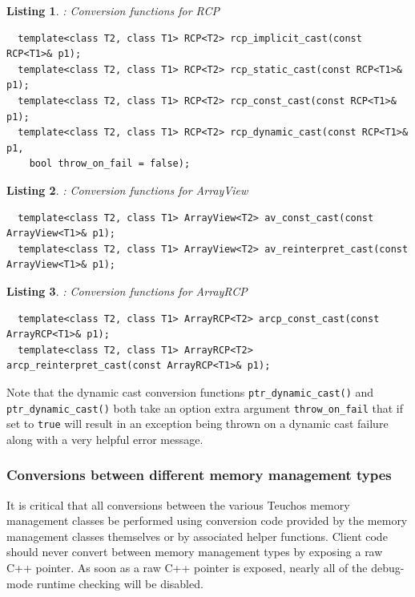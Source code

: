 \documentclass[pdf,ps2pdf,11pt]{SANDreport}
\newtheorem{listing}{Listing}
\begin{document}
\begin{listing}: Conversion functions for RCP\\
\label{listing:RCP-conversions}
{\small\begin{verbatim}
  template<class T2, class T1> RCP<T2> rcp_implicit_cast(const RCP<T1>& p1);
  template<class T2, class T1> RCP<T2> rcp_static_cast(const RCP<T1>& p1);
  template<class T2, class T1> RCP<T2> rcp_const_cast(const RCP<T1>& p1);
  template<class T2, class T1> RCP<T2> rcp_dynamic_cast(const RCP<T1>& p1,
    bool throw_on_fail = false);
\end{verbatim}}
\end{listing}

\begin{listing}: Conversion functions for ArrayView\\
\label{listing:ArrayView-conversions}
{\small\begin{verbatim}
  template<class T2, class T1> ArrayView<T2> av_const_cast(const ArrayView<T1>& p1);
  template<class T2, class T1> ArrayView<T2> av_reinterpret_cast(const ArrayView<T1>& p1);
\end{verbatim}}
\end{listing}

\begin{listing}: Conversion functions for ArrayRCP\\
\label{listing:ArrayRCP-conversions}
{\small\begin{verbatim}
  template<class T2, class T1> ArrayRCP<T2> arcp_const_cast(const ArrayRCP<T1>& p1);
  template<class T2, class T1> ArrayRCP<T2> arcp_reinterpret_cast(const ArrayRCP<T1>& p1);
\end{verbatim}}
\end{listing}

Note that the dynamic cast conversion functions
{}\texttt{ptr\_dynamic\_cast()} and {}\texttt{ptr\_dynamic\_cast()}
both take an option extra argument {}\texttt{throw\_on\_fail} that if
set to {}\texttt{true} will result in an exception being thrown on a
dynamic cast failure along with a very helpful error message.


%
{}\subsubsection{Conversions between different memory management types}
\label{sec:teuchos-type-conversions}
%

It is critical that all conversions between the various Teuchos memory
management classes be performed using conversion code provided by the
memory management classes themselves or by associated helper
functions.  Client code should never convert between memory management
types by exposing a raw C++ pointer.  As soon as a raw C++ pointer is
exposed, nearly all of the debug-mode runtime checking will be
disabled.
\end{document}
